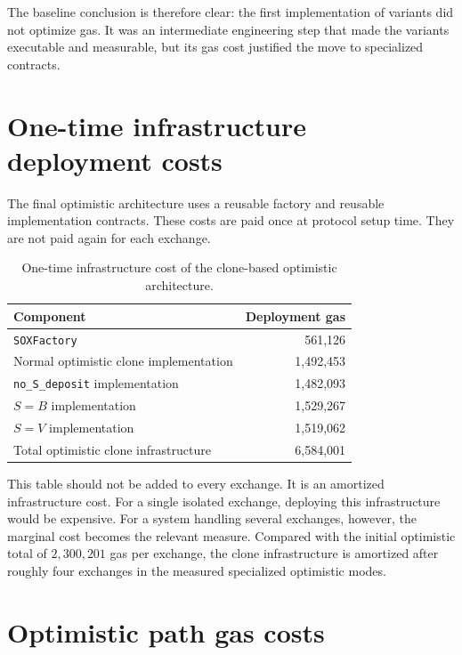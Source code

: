 The baseline conclusion is therefore clear: the first implementation of variants did not
optimize gas. It was an intermediate engineering step that made the variants executable and
measurable, but its gas cost justified the move to specialized contracts.

\section{One-time infrastructure deployment costs}

The final optimistic architecture uses a reusable factory and reusable implementation
contracts. These costs are paid once at protocol setup time. They are not paid again for
each exchange.

\begin{table}[htbp]
  \centering
  \begin{tabularx}{\linewidth}{>{\raggedright\arraybackslash}Xr}
    \toprule
    Component & Deployment gas \\
    \midrule
    \texttt{SOXFactory} & 561,126 \\
    Normal optimistic clone implementation & 1,492,453 \\
    \texttt{no\_S\_deposit} implementation & 1,482,093 \\
    \(S=B\) implementation & 1,529,267 \\
    \(S=V\) implementation & 1,519,062 \\
    \midrule
    Total optimistic clone infrastructure & 6,584,001 \\
    \bottomrule
  \end{tabularx}
  \caption{One-time infrastructure cost of the clone-based optimistic architecture.}
  \label{tab:factory-infrastructure-cost}
\end{table}

This table should not be added to every exchange. It is an amortized infrastructure cost.
For a single isolated exchange, deploying this infrastructure would be expensive. For a
system handling several exchanges, however, the marginal cost becomes the relevant measure.
Compared with the initial optimistic total of \(2,300,201\) gas per exchange, the clone
infrastructure is amortized after roughly four exchanges in the measured specialized
optimistic modes.

\section{Optimistic path gas costs}

